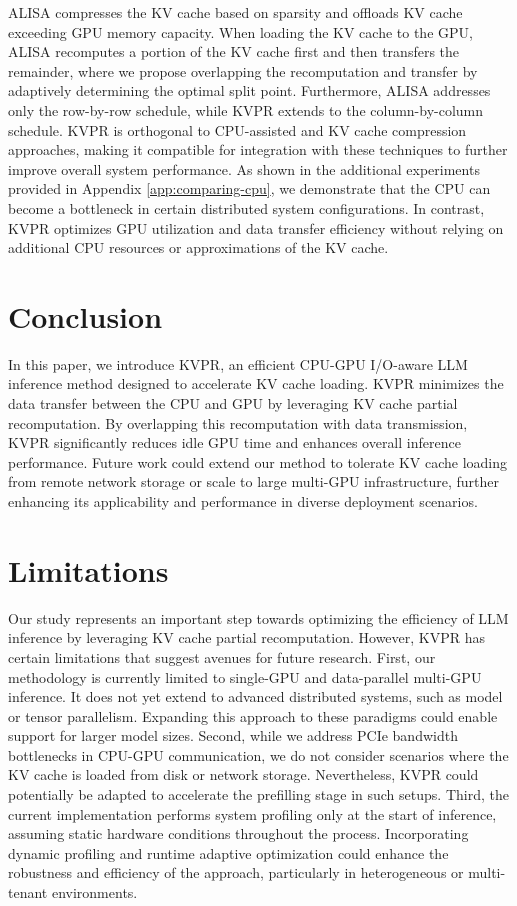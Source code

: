 \documentclass[11pt]{article}
\newcommand{\paperName}{KVPR}
\begin{document}
ALISA \cite{zhao2024alisa} compresses the KV cache based on sparsity and offloads KV cache exceeding GPU memory capacity. When loading the KV cache to the GPU, ALISA recomputes a portion of the KV cache first and then transfers the remainder, where we propose overlapping the recomputation and transfer by adaptively determining the optimal split point. Furthermore, ALISA addresses only the row-by-row schedule, while {\paperName} extends to the column-by-column schedule.
{\paperName} is orthogonal to CPU-assisted and KV cache compression approaches, making it compatible for integration with these techniques to further improve overall system performance. As shown in the additional experiments provided in Appendix \ref{app:comparing-cpu}, we demonstrate that the CPU can become a bottleneck in certain distributed system configurations. In contrast, {\paperName} optimizes GPU utilization and data transfer efficiency without relying on additional CPU resources or approximations of the KV cache.



\section{Conclusion}

In this paper, we introduce {\paperName}, an efficient CPU-GPU I/O-aware LLM inference method designed to accelerate KV cache loading. {\paperName} minimizes the data transfer between the CPU and GPU by leveraging KV cache partial recomputation. By overlapping this recomputation with data transmission, {\paperName} significantly reduces idle GPU time and enhances overall inference performance. 
Future work could extend our method to tolerate KV cache loading from remote network storage or scale to large multi-GPU infrastructure, further enhancing its applicability and performance in diverse deployment scenarios.

\section{Limitations}
Our study represents an important step towards optimizing the efficiency of LLM inference by leveraging KV cache partial recomputation. However, {\paperName} has certain limitations that suggest avenues for future research.
First, our methodology is currently limited to single-GPU and data-parallel multi-GPU inference. It does not yet extend to advanced distributed systems, such as model or tensor parallelism. Expanding this approach to these paradigms could enable support for larger model sizes.
Second, while we address PCIe bandwidth bottlenecks in CPU-GPU communication, we do not consider scenarios where the KV cache is loaded from disk or network storage. Nevertheless, {\paperName} could potentially be adapted to accelerate the prefilling stage in such setups.
Third, the current implementation performs system profiling only at the start of inference, assuming static hardware conditions throughout the process. Incorporating dynamic profiling and runtime adaptive optimization could enhance the robustness and efficiency of the approach, particularly in heterogeneous or multi-tenant environments.
\end{document}
